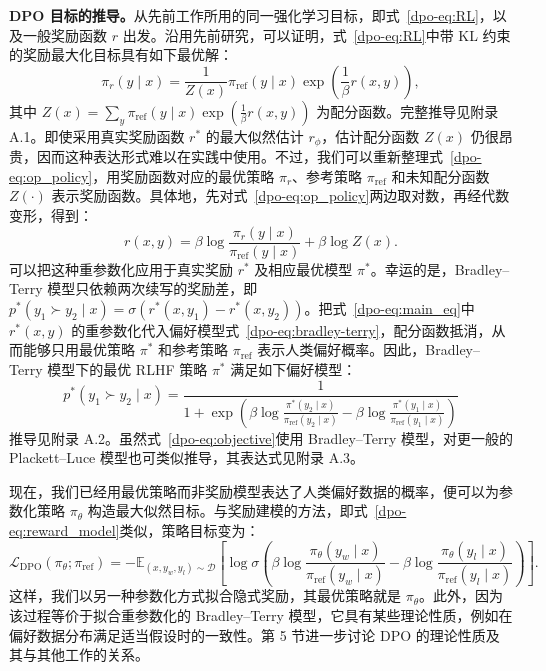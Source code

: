 \textbf{DPO 目标的推导。}从先前工作所用的同一强化学习目标，即式~\ref{dpo-eq:RL}，以及一般奖励函数 $r$ 出发。沿用先前研究\cite{dpo-peters2007reinforcement,dpo-peng2019advantage,dpo-korbak2022reinforcement,dpo-go2023aligning}，可以证明，式~\ref{dpo-eq:RL}中带 KL 约束的奖励最大化目标具有如下最优解：
\begin{equation}\label{dpo-eq:op_policy}
    \pi_r(y\mid x) = \frac{1}{Z(x)}\pi_{\mathrm{ref}}(y\mid x)\exp\left(\frac{1}{\beta}r(x, y)\right),
\end{equation}%
其中 $Z(x)=\sum_y\pi_{\mathrm{ref}}(y\mid x)\exp(\frac1\beta r(x,y))$ 为配分函数。完整推导见附录 A.1。即使采用真实奖励函数 $r^*$ 的最大似然估计 $r_\phi$，估计配分函数 $Z(x)$ 仍很昂贵\cite{dpo-korbak2022reinforcement,dpo-go2023aligning}，因而这种表达形式难以在实践中使用。不过，我们可以重新整理式~\ref{dpo-eq:op_policy}，用奖励函数对应的最优策略 $\pi_r$、参考策略 $\pi_{\mathrm{ref}}$ 和未知配分函数 $Z(\cdot)$ 表示奖励函数。具体地，先对式~\ref{dpo-eq:op_policy}两边取对数，再经代数变形，得到：
\begin{equation}\label{dpo-eq:main_eq}
    r(x,y) =\beta \log \frac{\pi_r(y\mid x)}{\pi_{\mathrm{ref}}(y\mid x)} + \beta \log Z(x).
\end{equation}
可以把这种重参数化应用于真实奖励 $r^*$ 及相应最优模型 $\pi^*$。幸运的是，Bradley--Terry 模型只依赖两次续写的奖励差，即 ${p^*(y_1\succ y_2\mid x)=\sigma(r^*(x,y_1)-r^*(x,y_2))}$。把式~\ref{dpo-eq:main_eq}中 $r^*(x,y)$ 的重参数化代入偏好模型式~\ref{dpo-eq:bradley-terry}，配分函数抵消，从而能够只用最优策略 $\pi^*$ 和参考策略 $\pi_{\mathrm{ref}}$ 表示人类偏好概率。因此，Bradley--Terry 模型下的最优 RLHF 策略 $\pi^*$ 满足如下偏好模型：
\begin{equation}\label{dpo-eq:objective}
    p^*(y_1\succ y_2 \mid x)=\frac{1}{1 + \exp\left(\beta \log \frac{\pi^*(y_2\mid x)}{\pi_{\mathrm{ref}}(y_2\mid x)} - \beta \log \frac{\pi^*(y_1\mid x)}{\pi_{\mathrm{ref}}(y_1\mid x)}\right)}
\end{equation}
推导见附录 A.2。虽然式~\ref{dpo-eq:objective}使用 Bradley--Terry 模型，对更一般的 Plackett--Luce 模型\cite{dpo-plackett1975analysis,dpo-luce2012individual}也可类似推导，其表达式见附录 A.3。

现在，我们已经用最优策略而非奖励模型表达了人类偏好数据的概率，便可以为参数化策略 $\pi_\theta$ 构造最大似然目标。与奖励建模的方法，即式~\ref{dpo-eq:reward_model}类似，策略目标变为：
\begin{equation}\label{dpo-eq:optimum_model}
    \mathcal{L}_\text{DPO}(\pi_{\theta}; \pi_{\mathrm{ref}}) = -\mathbb{E}_{(x, y_w, y_l)\sim \mathcal{D}}\left[\log \sigma \left(\beta \log \frac{\pi_{\theta}(y_w\mid x)}{\pi_{\mathrm{ref}}(y_w\mid x)} - \beta \log \frac{\pi_{\theta}(y_l\mid x)}{\pi_{\mathrm{ref}}(y_l\mid x)}\right)\right].
\end{equation}
这样，我们以另一种参数化方式拟合隐式奖励，其最优策略就是 $\pi_\theta$。此外，因为该过程等价于拟合重参数化的 Bradley--Terry 模型，它具有某些理论性质，例如在偏好数据分布满足适当假设时的一致性\cite{dpo-bong2022generalized}。第 5 节进一步讨论 DPO 的理论性质及其与其他工作的关系。

